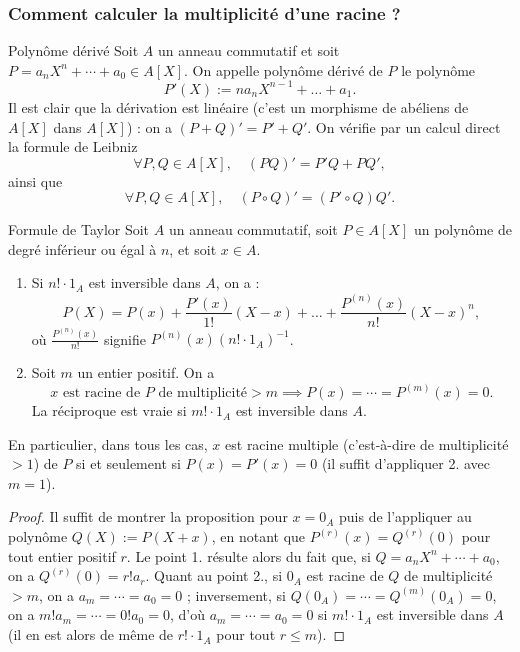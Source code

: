 \documentclass[]{report}
\begin{document}
\subsubsection{Comment calculer la multiplicité d'une racine ?}

\begin{df}{Polynôme dérivé}{}
    Soit $A$ un anneau commutatif et soit $P = a_n X^n + \cdots + a_0 \in A[X]$. On appelle polynôme dérivé de $P$ le polynôme
    \[P'(X) := n a_n X^{n-1} + \dots + a_1.\]
    Il est clair que la dérivation est linéaire (c'est un morphisme de \grs abéliens de $A[X]$ dans $A[X]$) : on a $(P + Q)' = P' + Q'$. On vérifie par un calcul direct la formule de Leibniz
    \[\forall P, Q \in A[X], \quad (PQ)' = P'Q + PQ',\]
    ainsi que
    \[\forall P, Q \in A[X], \quad (P \circ Q)' = (P' \circ Q) Q'.\]
\end{df}

\begin{prop}{Formule de Taylor}{}
    Soit $A$ un anneau commutatif, soit $P \in A[X]$ un polynôme de degré inférieur ou égal à $n$, et soit $x \in A$.
    \begin{enumerate}
        \item Si $n! \cdot 1_A$ est inversible dans $A$, on a :
        \[P(X) = P(x) + \frac{P'(x)}{1!}(X - x) + \dots + \frac{P^{(n)}(x)}{n!}(X - x)^n,\]
        où $\frac{P^{(n)}(x)}{n!}$ signifie $P^{(n)}(x)(n! \cdot 1_A)^{-1}$.
        \item Soit $m$ un entier positif. On a
        \[x \text{ est racine de } P \text{ de multiplicité} > m \implies P(x) = \cdots = P^{(m)}(x) = 0.\]
        La réciproque est vraie si $m! \cdot 1_A$ est inversible dans $A$.
    \end{enumerate}
    En particulier, dans tous les cas, $x$ est racine multiple (c'est-à-dire de multiplicité $> 1$) de $P$ si et seulement si $P(x) = P'(x) = 0$ (il suffit d'appliquer 2. avec $m = 1$).
\end{prop}

\begin{proof}
    Il suffit de montrer la proposition pour $x = 0_A$ puis de l'appliquer au polynôme $Q(X) := P(X + x)$, en notant que $P^{(r)}(x) = Q^{(r)}(0)$ pour tout entier positif $r$. Le point 1. résulte alors du fait que, si $Q = a_n X^n + \cdots + a_0$, on a $Q^{(r)}(0) = r!a_r$. Quant au point 2., si $0_A$ est racine de $Q$ de multiplicité $> m$, on a $a_m = \cdots = a_0 = 0$ ; inversement, si $Q(0_A) = \cdots = Q^{(m)}(0_A) = 0$, on a $m!a_m = \cdots = 0!a_0 = 0$, d'où $a_m = \cdots = a_0 = 0$ si $m! \cdot 1_A$ est inversible dans $A$ (il en est alors de même de $r! \cdot 1_A$ pour tout $r \le m$).
\end{proof}
\end{document}
